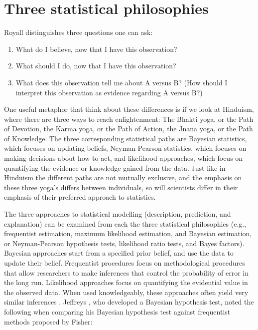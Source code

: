 \documentclass[
]{krantz}
\providecommand{\tightlist}{%
  \setlength{\itemsep}{0pt}\setlength{\parskip}{0pt}}
\begin{document}
\hypertarget{three-statistical-philosophies}{%
\section{Three statistical philosophies}\label{three-statistical-philosophies}}

Royall \citeyearpar{royall_statistical_1997} distinguishes three questions one can ask:

\begin{enumerate}
\def\labelenumi{\arabic{enumi}.}
\tightlist
\item
  What do I believe, now that I have this observation?
\item
  What should I do, now that I have this observation?
\item
  What does this observation tell me about A versus B? (How should I interpret this observation as evidence regarding A versus B?)
\end{enumerate}

One useful metaphor that think about these differences is if we look at Hinduism, where there are three ways to reach enlightenment: The Bhakti yoga, or the Path of Devotion, the Karma yoga, or the Path of Action, the Jnana yoga, or the Path of Knowledge. The three corresponding statistical paths are Bayesian statistics, which focuses on updating beliefs, Neyman-Pearson statistics, which focuses on making decisions about how to act, and likelihood approaches, which focus on quantifying the evidence or knowledge gained from the data. Just like in Hinduism the different paths are not mutually exclusive, and the emphasis on these three yoga's differs between individuals, so will scientists differ in their emphasis of their preferred approach to statistics.

The three approaches to statistical modelling (description, prediction, and explanation) can be examined from each the three statistical philosophies (e.g., frequentist estimation, maximum likelihood estimation, and Bayesian estimation, or Neyman-Pearson hypothesis tests, likelihood ratio tests, and Bayes factors). Bayesian approaches start from a specified prior belief, and use the data to update their belief. Frequentist procedures focus on methodological procedures that allow researchers to make inferences that control the probability of error in the long run. Likelihood approaches focus on quantifying the evidential value in the observed data. When used knowledgeably, these approaches often yield very similar inferences \citep{dongen_multiple_2019, lakens_improving_2020, tendeiro_review_2019}. Jeffreys \citeyearpar{jeffreys_theory_1939}, who developed a Bayesian hypothesis test, noted the following when comparing his Bayesian hypothesis test against frequentist methods proposed by Fisher:
\end{document}
